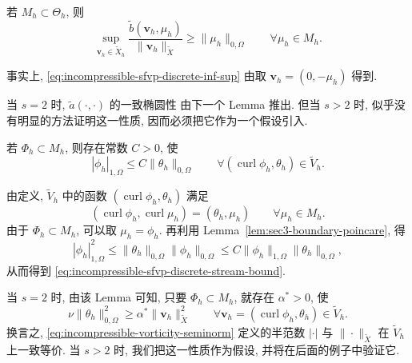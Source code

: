 \begin{Lemma}\label{lem:incompressible-sfvp-discrete-inf-sup}
若 $M_h\subset\Theta_h$, 则
\begin{equation}\label{eq:incompressible-sfvp-discrete-inf-sup}
\sup_{\mathbf v_h\in\widetilde X_h}
\frac{\widetilde b(\mathbf v_h,\mu_h)}
{\|\mathbf v_h\|_{\widetilde X}}
\geq\|\mu_h\|_{0,\Omega}
\qquad\forall\mu_h\in M_h.
\end{equation}
\end{Lemma}

事实上, \eqref{eq:incompressible-sfvp-discrete-inf-sup}
由取 $\mathbf v_h=(0,-\mu_h)$ 得到.

当 $s=2$ 时, $\widetilde a(\cdot,\cdot)$ 的一致椭圆性
由下一个 Lemma 推出. 但当 $s>2$ 时, 似乎没有明显的方法证明这一性质,
因而必须把它作为一个假设引入.

\begin{Lemma}\label{lem:incompressible-sfvp-discrete-stream-bound}
若 $\Phi_h\subset M_h$, 则存在常数 $C>0$, 使
\begin{equation}\label{eq:incompressible-sfvp-discrete-stream-bound}
|\phi_h|_{1,\Omega}
\leq C\|\theta_h\|_{0,\Omega}
\qquad
\forall(\operatorname{curl}\phi_h,\theta_h)\in\widetilde V_h.
\end{equation}
\end{Lemma}

\begin{Proof}
由定义, $\widetilde V_h$ 中的函数
$(\operatorname{curl}\phi_h,\theta_h)$ 满足
\[
(\operatorname{curl}\phi_h,\operatorname{curl}\mu_h)
=(\theta_h,\mu_h)
\qquad\forall\mu_h\in M_h.
\]
由于 $\Phi_h\subset M_h$, 可以取 $\mu_h=\phi_h$.
再利用 Lemma~\ref{lem:sec3-boundary-poincare}, 得
\[
|\phi_h|_{1,\Omega}^2
\leq\|\theta_h\|_{0,\Omega}\|\phi_h\|_{0,\Omega}
\leq C\|\phi_h\|_{1,\Omega}\|\theta_h\|_{0,\Omega},
\]
从而得到 \eqref{eq:incompressible-sfvp-discrete-stream-bound}.
\end{Proof}

当 $s=2$ 时, 由该 Lemma 可知, 只要 $\Phi_h\subset M_h$,
就存在 $\alpha^*>0$, 使
\begin{equation}\label{eq:incompressible-sfvp-discrete-ellipticity}
\nu\|\theta_h\|_{0,\Omega}^2
\geq\alpha^*\|\mathbf v_h\|_{\widetilde X}^2
\qquad
\forall\mathbf v_h=(\operatorname{curl}\phi_h,\theta_h)
\in\widetilde V_h.
\end{equation}
换言之, \eqref{eq:incompressible-vorticity-seminorm} 定义的半范数
$|\cdot|$ 与 $\|\cdot\|_{\widetilde X}$
在 $\widetilde V_h$ 上一致等价.
当 $s>2$ 时, 我们把这一性质作为假设, 并将在后面的例子中验证它.

